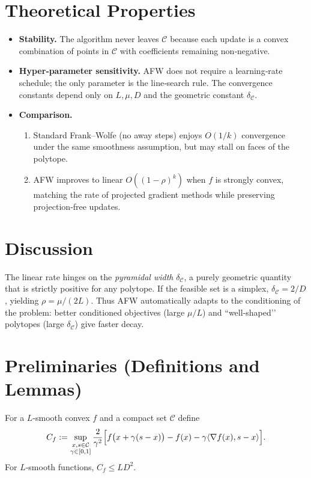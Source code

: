 \documentclass{article}
\begin{document}
\section*{Theoretical Properties}
\begin{itemize}
\item \textbf{Stability.} The algorithm never leaves $\mathcal{C}$ because each update is a convex combination of points in $\mathcal{C}$ with coefficients remaining non‑negative.
\item \textbf{Hyper‑parameter sensitivity.} AFW does not require a learning‑rate schedule; the only parameter is the line‑search rule. The convergence constants depend only on $L,\mu,D$ and the geometric constant $\delta_{\mathcal{C}}$.
\item \textbf{Comparison.}
    \begin{enumerate}
    \item Standard Frank–Wolfe (no away steps) enjoys $O(1/k)$ convergence under the same smoothness assumption, but may stall on faces of the polytope.
    \item AFW improves to linear $O((1-\rho)^k)$ when $f$ is strongly convex, matching the rate of projected gradient methods while preserving projection‑free updates.
    \end{enumerate}
\end{itemize}

\section*{Discussion}
The linear rate hinges on the \emph{pyramidal width} $\delta_{\mathcal{C}}$, a purely geometric quantity that is strictly positive for any polytope.  
If the feasible set is a simplex, $\delta_{\mathcal{C}}=2/D$, yielding $\rho=\mu/(2L)$.  
Thus AFW automatically adapts to the conditioning of the problem: better conditioned objectives (large $\mu/L$) and “well‑shaped’’ polytopes (large $\delta_{\mathcal{C}}$) give faster decay.

\newpage
\section*{Preliminaries (Definitions and Lemmas)}

\begin{definition}\label{def:curv}
For a $L$‑smooth convex $f$ and a compact set $\mathcal{C}$ define
\[
C_f:=\sup_{\substack{x,s\in\mathcal{C}\\ \gamma\in[0,1]}}
\frac{2}{\gamma^2}\Bigl[f\bigl(x+\gamma(s-x)\bigr)-f(x)-\gamma\langle\nabla f(x),s-x\rangle\Bigr].
\]
For $L$‑smooth functions, $C_f\le L D^2$.
\end{definition}
\end{document}
